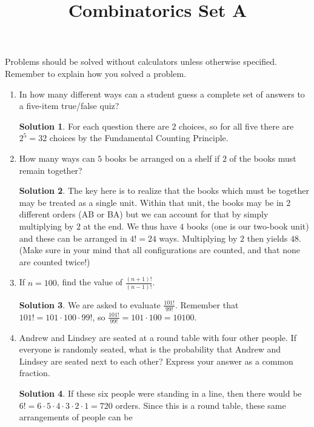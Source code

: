 \documentclass{article}
\title{Combinatorics Set A}
\author{}
\date{}
\theoremstyle{definition}
\newtheorem*{solution}{Solution}
\begin{document}
\maketitle
\noindent Problems should be solved without calculators unless otherwise 
specified. Remember to explain how you solved a problem.
\begin{enumerate}
    \item In how many different ways can a student guess a complete set of 
        answers to a five-item true/false quiz?
        \begin{solution}
            For each question there are $2$ choices, so for all five there are 
            $2^5 = 32$ choices by the Fundamental Counting Principle.
        \end{solution}
    \item How many ways can $5$ books be arranged on a shelf if $2$ of the books 
        must remain together?
        \begin{solution}
            The key here is to realize that the books which must be together may 
            be treated as a single unit. Within that unit, the books may be in 
            $2$ different orders (AB or BA) but we can account for that by 
            simply multiplying by $2$ at the end. We thus have $4$ books (one is 
            our two-book unit) and these can be arranged in $4! = 24$ ways.  
            Multiplying by $2$ then yields $48$. (Make sure in your mind that 
            all configurations are counted, and that none are counted twice!)
        \end{solution}
    \item If $n = 100$, find the value of $\frac{(n+1)!}{(n-1)!}$.
        \begin{solution}
            We are asked to evaluate $\frac{101!}{99!}$. Remember that $101! = 
            101 \cdot 100 \cdot 99!$, so $\frac{101!}{99!} = 101 \cdot 100 = 
            10100$.
        \end{solution}
    \item Andrew and Lindsey are seated at a round table with four other people.  
        If everyone is randomly seated, what is the probability that Andrew and 
        Lindsey are seated next to each other? Express your answer as a common 
        fraction.
        \begin{solution}
            If these six people were standing in a line, then there would be $6!  
            = 6 \cdot 5 \cdot 4 \cdot 3 \cdot 2 \cdot 1 = 720$ orders. Since 
            this is a round table, these same arrangements of people can be 

\end{solution}
\end{enumerate}
\end{document}
